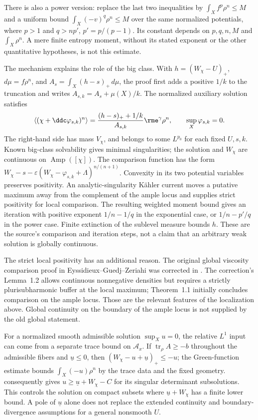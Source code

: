 There is also a power version: replace the last two inequalities
by $\int_X f^p\rho^n\leq M$ and a uniform bound
$\int_X(-v)^q\rho^n\leq M$ over the same normalized potentials,
where $p>1$ and $q>np'$, $p'=p/(p-1)$. Its constant depends on
$p,q,n,M$ and $\int_X\rho^n$. A mere finite entropy moment,
without its stated exponent or the other quantitative hypotheses,
is not this estimate.

The mechanism explains the role of the big class. With
$h=(W_\chi-U)_+$, $d\mu=f\rho^n$, and
$A_s=\int_X(h-s)_+\,d\mu$, the proof first adds a positive
$1/k$ to the truncation and writes $A_{s,k}=A_s+\mu(X)/k$.
The normalized auxiliary solution satisfies
\[
 \left\langle(\chi+\ddc\varphi_{s,k})^n\right\rangle
 =\frac{(h-s)_++1/k}{A_{s,k}}\rme^\gamma\rho^n,
 \qquad \sup_X\varphi_{s,k}=0.
\]
The right-hand side has mass $V_\chi$, and belongs to some
$L^{p_0}$ for each fixed $U,s,k$. Known big-class solvability
gives minimal singularities; the solution and $W_\chi$ are
continuous on $\operatorname{Amp}([\chi])$.
The comparison function has the form
$W_\chi-s-\varepsilon(W_\chi-\varphi_{s,k}+\Lambda)^{n/(n+1)}$.
Convexity in its two potential variables preserves positivity.
An analytic-singularity K\"ahler current moves a putative maximum
away from the complement of the ample locus and supplies strict
positivity for local comparison. The resulting weighted moment
bound gives an iteration with positive exponent
$1/n-1/q$ in the exponential case, or $1/n-p'/q$ in the power
case. Finite extinction of the sublevel measure bounds $h$.
These are the source's comparison and iteration steps, not a
claim that an arbitrary weak solution is globally continuous.

The strict local positivity has an additional reason. The original
global viscosity comparison proof in Eyssidieux--Guedj--Zeriahi
was corrected in \cite{EGZ16ViscosityErratumV1}. The correction's
Lemma~1.2 allows continuous nonnegative densities but requires
a strictly plurisubharmonic buffer at the local maximum;
Theorem~1.1 initially concludes comparison on the ample locus.
Those are the relevant features of the localization above.
Global continuity on the boundary of the ample locus is not
supplied by the old global statement.

For a normalized smooth admissible solution $\sup_Xu=0$, the
relative $L^1$ input can come from a separate trace bound on
$\mathcal A_x$. If $\operatorname{tr}_\rho A\geq-b$ throughout
the admissible fibers and $\underline u\leq0$, then
$(W_\chi-u+\underline u)_+\leq-u$; the Green-function estimate
bounds $\int_X(-u)\rho^n$ by the trace data and the fixed geometry.
\cite[Theorem~3.15]{FangMaWu26DeterminantalV1} consequently gives
$u\geq\underline u+W_\chi-C$ for its singular determinant
subsolutions. This controls the solution on compact subsets where
$\underline u+W_\chi$ has a finite lower bound. A pole of
$\underline u$ alone does not replace the extended continuity
and boundary-divergence assumptions for a general nonsmooth $U$.

